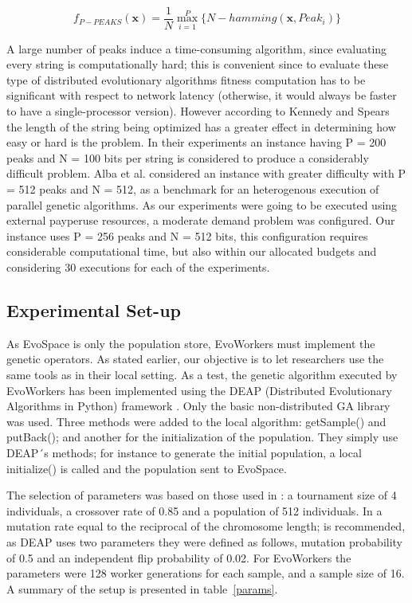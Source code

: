 \documentclass{llncs}
\begin{document}
\begin{equation}
f_{P-PEAKS}(\mathbf{x})=\frac{1}{N} \overset{P}{\max_{i=1}} \{N-hamming(\mathbf{x},Peak_i)   \}
\end{equation}

A large number of peaks induce a time-consuming algorithm,
since evaluating every string is computationally hard; this is
convenient since to evaluate these type of distributed evolutionary
algorithms fitness computation has to be significant with respect to
network latency (otherwise, it would always be faster to have a
single-processor version). However
according to Kennedy and Spears \cite{Kennedy:1998ch} the length of
the string being optimized has a greater effect in determining how
easy or hard is the problem. In their experiments an instance having P
= 200 peaks and N = 100 bits per string is considered to produce a
considerably difficult problem. Alba et al. \cite{Alba:2002dq}
considered an instance with greater difficulty with P = 512 peaks and
N = 512, as a benchmark for an heterogenous execution of parallel
genetic algorithms. As our  experiments were going to be executed
using external pay\textendash per\textendash use resources, a moderate
demand problem was configured. Our instance uses P = 256 peaks and N =
512 bits, this configuration requires considerable computational time,
but also within our allocated budgets and considering 30 executions for each of the experiments.

\subsection{Experimental Set-up}
As EvoSpace is only the population store, EvoWorkers must implement the genetic operators. As stated earlier, our objective is to let researchers use the same tools as in their local setting. As a test, the genetic algorithm executed by EvoWorkers has been implemented using the DEAP (Distributed Evolutionary Algorithms in Python) framework \cite{DEAP_JMLR2012}. Only the basic non-distributed GA library was used. Three methods were added to the local algorithm: getSample() and  putBack(); and  another for the  initialization of the population. They simply use DEAP´s methods; for instance to generate the initial population, a local initialize() is called and the population sent to EvoSpace.

The selection of parameters was based on those used in \cite{Alba:2002dq}: a
tournament size of 4 individuals, a crossover rate of 0.85 and a
population of 512 individuals. In  \cite{Jong:PS97} a mutation rate
equal to the reciprocal of the chromosome length; is recommended, as
DEAP uses two parameters they were defined as follows, mutation
probability of 0.5 and an independent flip probability of 0.02. For
EvoWorkers the parameters were 128 worker generations for each
sample, and a sample size of 16. A summary of the setup is presented in table~\ref{params}.
\end{document}
